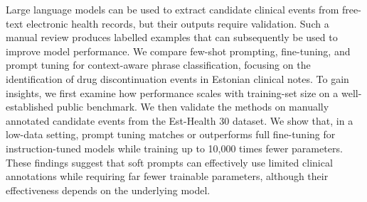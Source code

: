 Large language models can be used to extract candidate clinical
events from free-text electronic health records, but their outputs
require validation. Such a manual review produces labelled examples
that can subsequently be used to improve model performance. We
compare few-shot prompting, fine-tuning, and prompt tuning for
context-aware phrase classification, focusing on the identification
of drug discontinuation events in Estonian clinical notes. To gain
insights, we first examine how performance scales with training-set
size on a well-established public benchmark. We then validate the
methods on manually annotated candidate events from the Est-Health 30
dataset. We show that, in a low-data setting, prompt tuning matches
or outperforms full fine-tuning for instruction-tuned models while
training up to 10,000 times fewer parameters. These findings suggest
that soft prompts can effectively use limited clinical annotations
while requiring far fewer trainable parameters, although their
effectiveness depends on the underlying model.
